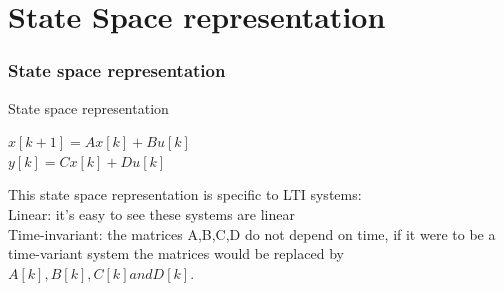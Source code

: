 \section{State Space representation}
\begin{frame}
	\frametitle{State space representation}
	\begin{definition}{State space representation}
		\begin{center}
			$x[k+1] = A x[k] + B u[k]$ \\
			$y[k] = C x[k] + D u[k] $ \\
		\end{center}
	\end{definition}
	This state space representation is specific to LTI systems:\\
	Linear: it’s easy to see these systems are linear \\
	Time-invariant: the matrices A,B,C,D do not depend on time, if it were to be a time-variant system the matrices would be replaced by $A[k], B[k], C[k] and D[k]$. \\
\end{frame}
